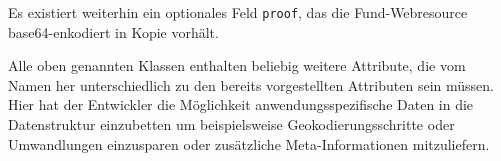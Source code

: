 Es existiert weiterhin ein optionales Feld \texttt{proof}, das die Fund-Webresource base64-enkodiert in Kopie vorhält.

Alle oben genannten Klassen enthalten beliebig weitere Attribute, die vom Namen her unterschiedlich zu den bereits vorgestellten Attributen sein müssen. Hier hat der Entwickler die Möglichkeit anwendungsspezifische Daten in die Datenstruktur einzubetten um beispielsweise Geokodierungsschritte oder Umwandlungen einzusparen oder zusätzliche Meta-Informationen mitzuliefern.


